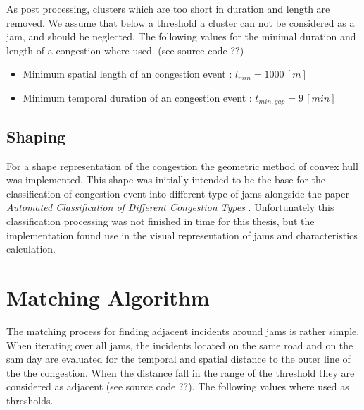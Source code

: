 As post processing, clusters which are too short in duration and length are removed. We assume that below a threshold a cluster can not be considered as a jam, and should be neglected. The following values for the minimal duration and length of a congestion where used. (see source code ??)

\begin{itemize}
	\item Minimum spatial length of an congestion event : $l_{min} = 1000 \, [m]$
	\item Minimum temporal duration of an congestion event : $t_{min,gap} = 9 \, [min]$
\end{itemize}

\subsection{Shaping}
\label{methodology_detection_shaping}
For a shape representation of the congestion the geometric method of convex hull was implemented. This shape was initially intended to be the base for the classification of congestion event into different type of jams alongside the paper \textit{Automated Classification of Different Congestion Types} \parencite{Kessler2020}. Unfortunately this classification processing was not finished in time for this thesis, but the implementation found use in the visual representation of jams and characteristics calculation.


\section{Matching Algorithm}
\label{methodology_matching}
The matching process for finding adjacent incidents around jams is rather simple. When iterating over all jams, the incidents located on the same road and on the sam day are evaluated for the temporal and spatial distance to the outer line of the the congestion. When the distance fall in the range of the threshold they are considered as adjacent (see source code ??). The following values where used as thresholds.

